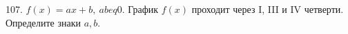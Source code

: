 107. $f(x)=ax+b,\ ab
eq 0.$ График $f(x)$ проходит через I, III и IV четверти. Определите знаки $a,b.$\\
